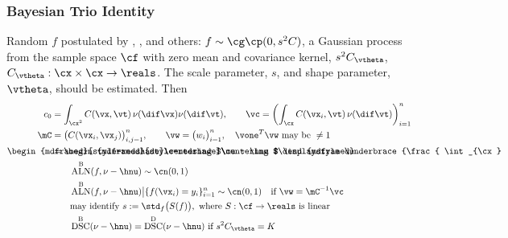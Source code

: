 \documentclass[10pt,compress,xcolor={usenames,dvipsnames}]{beamer} %
\DeclareMathOperator{\algn}{ALN}
\DeclareMathOperator{\disc}{DSC}
\DeclareMathOperator{\Var}{VAR}
\DeclareMathOperator{\GP}{\cg\cp}
\newcommand{\Dt}{\text{D}}
\newcommand{\Ba}{\text{B}}
\newcommand{\redroundmathbox}[1]{\parbox{\widthof{$#1$\hspace{1em}}}
	{\begin{mdframed}[style=redshade]\centering $#1$ \end{mdframed}}}
\begin{document}
\begin{frame}
	\frametitle{Bayesian Trio Identity}
	\vspace*{-4ex}
	\alert{Random} $f$ postulated by \cite{Dia88a}, \cite{OHa91a}, \cite{Rit00a}  and others:  $f \sim \GP (0, s^2C)$,  a \alert{Gaussian process} from the sample space $\cf$ with zero mean and covariance kernel, $s^2C_{\vtheta}$, $C_{\vtheta}:\cx \times \cx \to \reals$. The \alert{scale parameter}, $s$, and \alert{shape parameter}, $\vtheta$, should be estimated.  	 Then 
	\vspace{-1ex}
	\begin{align*}
	c_0 & = \int_{\cx^2} C(\vx,\vt) \, \nu(\dif \vx) \nu(\dif \vt), \qquad \vc = \biggl( \int_{\cx} C(\vx_i,\vt) \,\nu(\dif \vt) \biggr)_{i=1}^n \\
	\mC & = \bigl( C(\vx_i,\vx_j) \bigr)_{i,j=1}^n, \qquad \vw = \bigl(w_i \bigr)_{i=1}^n,  \quad \vone^T \vw \text{ may be } \ne 1\\
	\redroundmathbox{\mu - \hmu} 
	& = \redroundmathbox{\displaystyle%
		\underbrace{\frac{ \int_{\cx} f(\vx) \, (\nu - \hnu)(\dif\vx)}{s \sqrt{c_0 - 2 \vc^T \vw + \vw^T \mC \vw}}}_{\textstyle \algn^\Ba(f,\nu - \hnu)} \, 
		\underbrace{\sqrt{c_0 - 2 \vc^T \vw + \vw^T \mC \vw}}_{\textstyle\disc^\Ba(\nu - \hnu)} \, \underbrace{s}_{\textstyle\Var^\Ba(f)}}\\
	& \qquad \algn^\Ba(f,\nu - \hnu) \sim \cn ( 0, 1 ) \\
	& \qquad \algn^\Ba(f,\nu - \hnu) \big \vert \{f(\vx_i )= y_i\}_{i=1}^n \sim \cn (0,1) \quad \text{if } \vw = \mC^{-1}\vc \\
	& \qquad \text{may identify } s := \std_{f}\bigl(S(f)\bigr), \text{ where } S : \cf \to \reals \text{ is linear} \\
	& \qquad \disc^\Ba(\nu - \hnu) =  \disc^\Dt(\nu - \hnu) \text{ if } s^2 C_{\vtheta} = K
	\end{align*}	
\end{frame}
\end{document}
